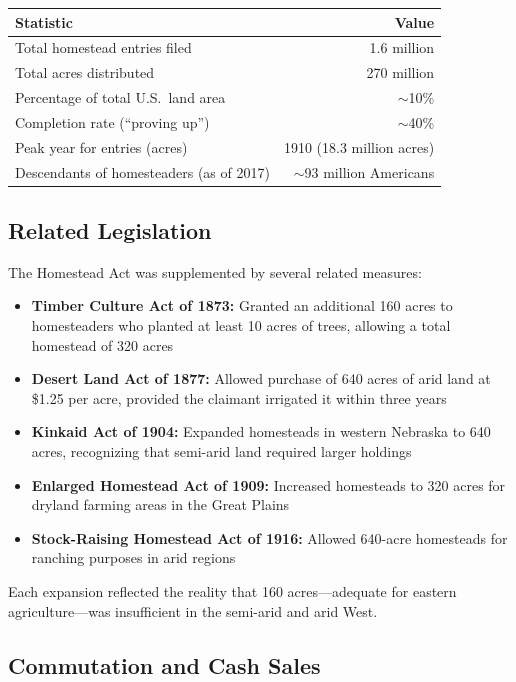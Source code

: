 \documentclass[12pt]{article}
\begin{document}
\begin{center}
\begin{tabular}{lr}
\toprule
Statistic & Value \\
\midrule
Total homestead entries filed & 1.6 million \\
Total acres distributed & 270 million \\
Percentage of total U.S.\ land area & $\sim$10\% \\
Completion rate (``proving up'') & $\sim$40\% \\
Peak year for entries (acres) & 1910 (18.3 million acres) \\
Descendants of homesteaders (as of 2017) & $\sim$93 million Americans \\
\bottomrule
\end{tabular}
\end{center}

\subsection{Related Legislation}

The Homestead Act was supplemented by several related measures:

\begin{itemize}
\item \textbf{Timber Culture Act of 1873:} Granted an additional 160 acres to homesteaders who planted at least 10 acres of trees, allowing a total homestead of 320 acres
\item \textbf{Desert Land Act of 1877:} Allowed purchase of 640 acres of arid land at \$1.25 per acre, provided the claimant irrigated it within three years
\item \textbf{Kinkaid Act of 1904:} Expanded homesteads in western Nebraska to 640 acres, recognizing that semi-arid land required larger holdings
\item \textbf{Enlarged Homestead Act of 1909:} Increased homesteads to 320 acres for dryland farming areas in the Great Plains
\item \textbf{Stock-Raising Homestead Act of 1916:} Allowed 640-acre homesteads for ranching purposes in arid regions
\end{itemize}

Each expansion reflected the reality that 160 acres---adequate for eastern agriculture---was insufficient in the semi-arid and arid West.

\subsection{Commutation and Cash Sales}
\end{document}
